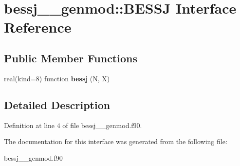 \hypertarget{interfacebessj____genmod_1_1_b_e_s_s_j}{\section{bessj\+\_\+\+\_\+genmod\+:\+:B\+E\+S\+S\+J Interface Reference}
\label{interfacebessj____genmod_1_1_b_e_s_s_j}
}
\subsection*{Public Member Functions}
\begin{DoxyCompactItemize}
\item 
\hypertarget{interfacebessj____genmod_1_1_b_e_s_s_j_aa148ad582108f5cf9706be7efe9fd30a}{real(kind=8) function {\bfseries bessj} (N, X)}\label{interfacebessj____genmod_1_1_b_e_s_s_j_aa148ad582108f5cf9706be7efe9fd30a}

\end{DoxyCompactItemize}


\subsection{Detailed Description}


Definition at line 4 of file bessj\+\_\+\+\_\+genmod.\+f90.



The documentation for this interface was generated from the following file\+:\begin{DoxyCompactItemize}
\item 
bessj\+\_\+\+\_\+genmod.\+f90\end{DoxyCompactItemize}
